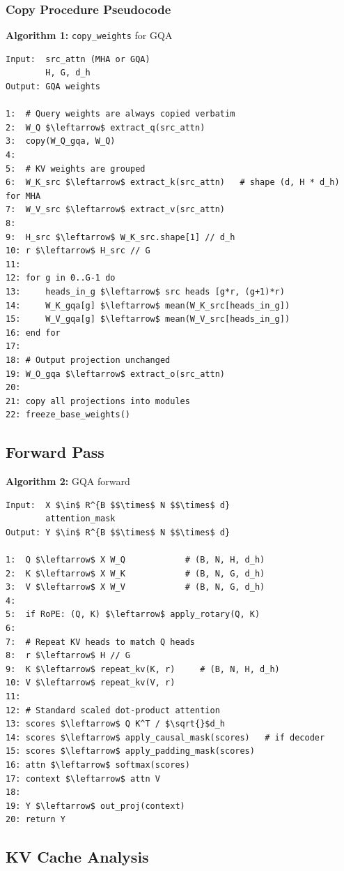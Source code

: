 \subsubsection{Copy Procedure Pseudocode}

\textbf{Algorithm 1:} \texttt{copy\_weights} for GQA
\begin{lstlisting}
Input:  src_attn (MHA or GQA)
        H, G, d_h
Output: GQA weights

1:  # Query weights are always copied verbatim
2:  W_Q $\leftarrow$ extract_q(src_attn)
3:  copy(W_Q_gqa, W_Q)
4:
5:  # KV weights are grouped
6:  W_K_src $\leftarrow$ extract_k(src_attn)   # shape (d, H * d_h) for MHA
7:  W_V_src $\leftarrow$ extract_v(src_attn)
8:
9:  H_src $\leftarrow$ W_K_src.shape[1] // d_h
10: r $\leftarrow$ H_src // G
11:
12: for g in 0..G-1 do
13:     heads_in_g $\leftarrow$ src heads [g*r, (g+1)*r)
14:     W_K_gqa[g] $\leftarrow$ mean(W_K_src[heads_in_g])
15:     W_V_gqa[g] $\leftarrow$ mean(W_V_src[heads_in_g])
16: end for
17:
18: # Output projection unchanged
19: W_O_gqa $\leftarrow$ extract_o(src_attn)
20:
21: copy all projections into modules
22: freeze_base_weights()
\end{lstlisting}

\subsection{Forward Pass}

\textbf{Algorithm 2:} GQA forward
\begin{lstlisting}
Input:  X $\in$ R^{B $$\times$ N $$\times$ d}
        attention_mask
Output: Y $\in$ R^{B $$\times$ N $$\times$ d}

1:  Q $\leftarrow$ X W_Q            # (B, N, H, d_h)
2:  K $\leftarrow$ X W_K            # (B, N, G, d_h)
3:  V $\leftarrow$ X W_V            # (B, N, G, d_h)
4:
5:  if RoPE: (Q, K) $\leftarrow$ apply_rotary(Q, K)
6:
7:  # Repeat KV heads to match Q heads
8:  r $\leftarrow$ H // G
9:  K $\leftarrow$ repeat_kv(K, r)     # (B, N, H, d_h)
10: V $\leftarrow$ repeat_kv(V, r)
11:
12: # Standard scaled dot-product attention
13: scores $\leftarrow$ Q K^T / $\sqrt{}$d_h
14: scores $\leftarrow$ apply_causal_mask(scores)   # if decoder
15: scores $\leftarrow$ apply_padding_mask(scores)
16: attn $\leftarrow$ softmax(scores)
17: context $\leftarrow$ attn V
18:
19: Y $\leftarrow$ out_proj(context)
20: return Y
\end{lstlisting}

\subsection{KV Cache Analysis}

